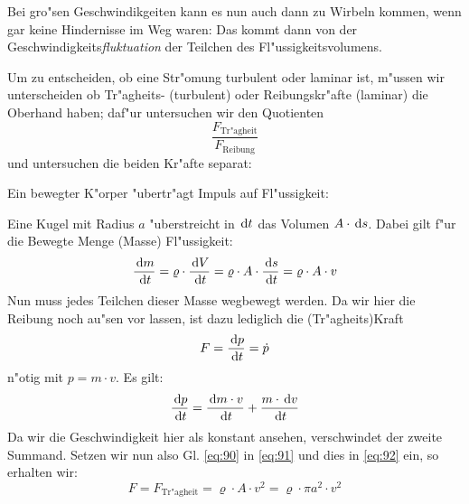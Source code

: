 Bei gro"sen Geschwindikgeiten kann es nun auch dann zu Wirbeln kommen,
wenn gar keine Hindernisse im Weg waren: Das kommt dann von der
Geschwindigkeits\emph{fluktuation} der Teilchen des
Fl"ussigkeitsvolumens.

\bigskip

Um zu entscheiden, ob eine Str"omung turbulent oder laminar ist, m"ussen
wir unterscheiden ob Tr"agheits- (turbulent) oder Reibungskr"afte
(laminar) die Oberhand haben; daf"ur untersuchen wir den Quotienten
\begin{equation*}
   \label{eq:89}
   \frac{F_\text{Tr"agheit}}{F_\text{Reibung}}
\end{equation*}
und untersuchen die beiden Kr"afte separat:
\begin{description}[\setlabelstyle{\bfseries\slshape}]
\item[Tr"agheit] Ein bewegter K"orper "ubertr"agt Impuls auf Fl"ussigkeit:

Eine Kugel mit Radius $a$ "uberstreicht in $\, \mathrm{d} t$ das Volumen $A
\cdot \, \mathrm{d} s$. 
Dabei gilt f"ur die Bewegte Menge (Masse) Fl"ussigkeit:
\begin{equation}
   \label{eq:90}
   \frac{\, \mathrm{d} m}{\, \mathrm{d}
  t} = \varrho \cdot \frac{\, \mathrm{d} V}{\, \mathrm{d} t} = \varrho \cdot A \cdot
\frac{\, \mathrm{d} s}{\, \mathrm{d} t} = \varrho \cdot A \cdot v
\end{equation}
Nun muss jedes Teilchen dieser Masse wegbewegt werden. Da wir hier die
Reibung noch au"sen vor lassen, ist dazu lediglich die (Tr"agheits)Kraft 
\begin{equation}
   \label{eq:92}
      F = \frac{\, \mathrm{d} p}{\, \mathrm{d} t} = \dot p
\end{equation}
 n"otig mit $p = m \cdot v$.
Es gilt:
\begin{equation}
   \label{eq:91}
   \frac{\, \mathrm{d} p}{\, \mathrm{d} t} = \frac{\, \mathrm{d} m \cdot v}{\, \mathrm{d} t} +
   \frac{m \cdot \, \mathrm{d} v }{\, \mathrm{d} t}
\end{equation}
Da wir die Geschwindigkeit hier als konstant ansehen, verschwindet der
zweite Summand. Setzen wir nun also Gl. \eqref{eq:90} in \eqref{eq:91}
und dies in \eqref{eq:92} ein, so erhalten wir:
\begin{equation}
   \label{eq:93}
   F = F_\text{Tr"agheit} = \varrho \cdot A \cdot v^2 = \varrho \cdot
   \pi a^2 \cdot v^2
\end{equation}



\end{description}
